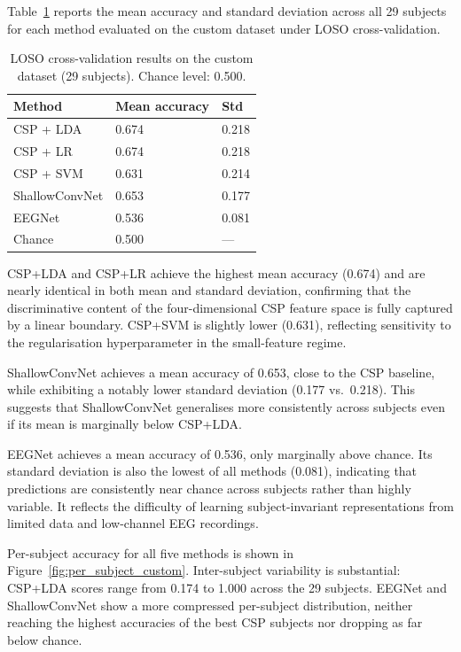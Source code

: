 \documentclass[english, bc, kiv, he, iso690alph, pdf]{fasthesis}
\begin{document}
Table~\ref{tab:results_custom} reports the mean accuracy and standard deviation across all 29 subjects for each method evaluated on the custom dataset under LOSO cross-validation.

\begin{table}[ht]
    \centering
    \caption{LOSO cross-validation results on the custom dataset (29 subjects). Chance level: 0.500.}
    \label{tab:results_custom}
    \begin{tabular}{lll}
        \hline
        \textbf{Method} & \textbf{Mean accuracy} & \textbf{Std} \\
        \hline
        CSP + LDA       & 0.674 & 0.218 \\
        CSP + LR        & 0.674 & 0.218 \\
        CSP + SVM       & 0.631 & 0.214 \\
        ShallowConvNet  & 0.653 & 0.177 \\
        EEGNet          & 0.536 & 0.081 \\
        \hline
        Chance          & 0.500 & —     \\
        \hline
    \end{tabular}
\end{table}

CSP+LDA and CSP+LR achieve the highest mean accuracy (0.674) and are nearly identical in both mean and standard deviation, confirming that the discriminative content of the four-dimensional CSP feature space is fully captured by a linear boundary. CSP+SVM is slightly lower (0.631), reflecting sensitivity to the regularisation hyperparameter in the small-feature regime.

ShallowConvNet achieves a mean accuracy of 0.653, close to the CSP baseline, while exhibiting a notably lower standard deviation (0.177 vs.\ 0.218). This suggests that ShallowConvNet generalises more consistently across subjects even if its mean is marginally below CSP+LDA.

EEGNet achieves a mean accuracy of 0.536, only marginally above chance. Its standard deviation is also the lowest of all methods (0.081), indicating that predictions are consistently near chance across subjects rather than highly variable. It reflects the difficulty of learning subject-invariant representations from limited data and low-channel EEG recordings.

Per-subject accuracy for all five methods is shown in Figure~\ref{fig:per_subject_custom}. Inter-subject variability is substantial: CSP+LDA scores range from 0.174 to 1.000 across the 29 subjects. EEGNet and ShallowConvNet show a more compressed per-subject distribution, neither reaching the highest accuracies of the best CSP subjects nor dropping as far below chance.
\end{document}
